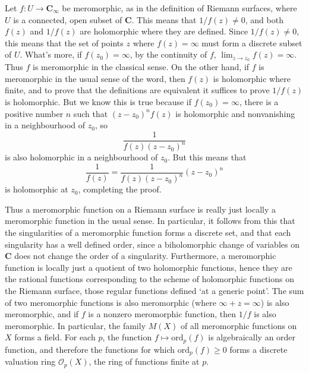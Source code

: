 \begin{example}
    Let $f: U \to \mathbf{C}_\infty$ be meromorphic, as in the definition of Riemann surfaces, where $U$ is a connected, open subset of $\mathbf{C}$. This means that $1/f(z) \neq 0$, and both $f(z)$ and $1/f(z)$ are holomorphic where they are defined. Since $1/f(z) \neq 0$, this means that the set of points $z$ where $f(z) = \infty$ must form a discrete subset of $U$. What's more, if $f(z_0) = \infty$, by the continuity of $f$, $\lim_{z \to z_0} f(z) = \infty$. Thus $f$ is meromorphic in the classical sense. On the other hand, if $f$ is meromorphic in the usual sense of the word, then $f(z)$ is holomorphic where finite, and to prove that the definitions are equivalent it suffices to prove $1/f(z)$ is holomorphic. But we know this is true because if $f(z_0) = \infty$, there is a positive number $n$ such that $(z - z_0)^n f(z)$ is holomorphic and nonvanishing in a neighbourhood of $z_0$, so
    \[ \frac{1}{f(z) (z - z_0)^n} \]
    is also holomorphic in a neighbourhood of $z_0$. But this means that
    \[ \frac{1}{f(z)} = \frac{1}{f(z) (z - z_0)^n} (z - z_0)^n \]
    is holomorphic at $z_0$, completing the proof.
\end{example}

Thus a meromorphic function on a Riemann surface is really just locally a meromorphic function in the usual sense. In particular, it follows from this that the singularities of a meromorphic function forms a discrete set, and that each singularity has a well defined order, since a biholomorphic change of variables on $\mathbf{C}$ does not change the order of a singularity. Furthermore, a meromorphic function is locally just a quotient of two holomorphic functions, hence they are the rational functions corresponding to the scheme of holomorphic functions on the Riemann surface, those regular functions defined `at a generic point'. The sum of two meromorphic functions is also meromorphic (where $\infty + z = \infty$) is also meromorphic, and if $f$ is a nonzero meromorphic function, then $1/f$ is also meromorphic. In particular, the family $M(X)$ of all meromorphic functions on $X$ forms a field. For each $p$, the function $f \mapsto \text{ord}_p(f)$ is algebraically an order function, and therefore the functions for which $\text{ord}_p(f) \geq 0$ forms a discrete valuation ring $\mathcal{O}_p(X)$, the ring of functions finite at $p$.

